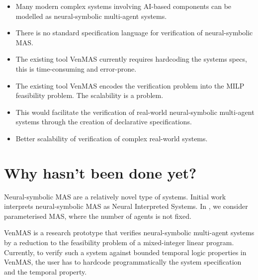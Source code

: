 \documentclass[11pt]{article}
\begin{document}

\begin{itemize}
\item Many modern complex systems involving AI-based components can be
  modelled as neural-symbolic multi-agent systems.
  
\item There is no standard specification language for verification of
  neural-symbolic MAS.

\item The existing tool VenMAS currently requires hardcoding the
  systems specs, this is time-consuming and error-prone.

\item The existing tool VenMAS encodes the verification problem into
  the MILP feasibility problem. The scalability is a problem.

\item This would facilitate the verification of real-world
  neural-symbolic multi-agent systems through the creation of
  declarative specifications.

\item Better scalability of verification of complex real-world systems.
\end{itemize}


\section{Why hasn't been done yet?}



Neural-symbolic MAS are a relatively novel type of systems. Initial
work \cite{Akintunde+18,Akintunde+20,Akintunde+22} interprets
neural-symbolic MAS as Neural Interpreted Systems. In
\cite{KouvarosBB24}, we consider parameterised MAS, where the number
of agents is not fixed.

VenMAS \cite{Akintunde+22b} is a research prototype that verifies
neural-symbolic multi-agent systems by a reduction to the feasibility
problem of a mixed-integer linear program.  Currently, to verify such
a system against bounded temporal logic properties in VenMAS, the user
has to hardcode programmatically the system specification and the
temporal property.
\end{document}
